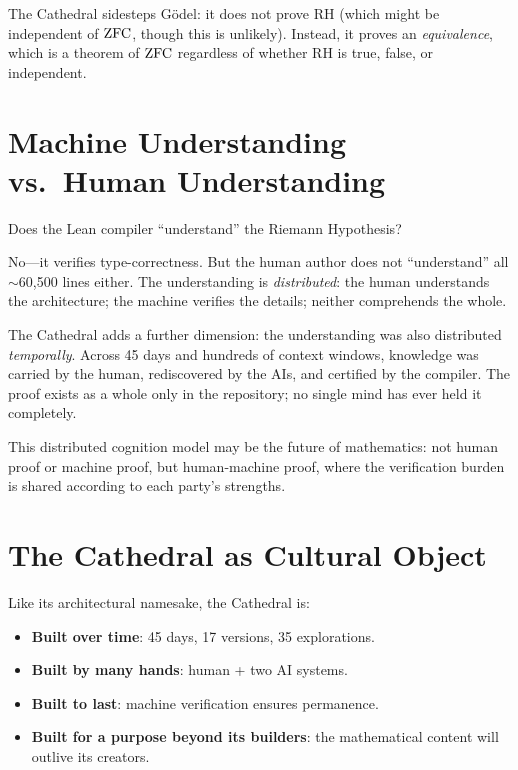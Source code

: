 \documentclass[11pt,a4paper]{article}
\begin{document}
The Cathedral sidesteps G\"odel: it does not prove RH (which might
be independent of $\mathrm{ZFC}$, though this is unlikely). Instead, it
proves an \emph{equivalence}, which is a theorem of $\mathrm{ZFC}$
regardless of whether RH is true, false, or independent.

\section{Machine Understanding vs.\ Human Understanding}

Does the Lean compiler ``understand'' the Riemann Hypothesis?

No---it verifies type-correctness. But the human author does not
``understand'' all $\sim$60{,}500 lines either. The understanding is
\emph{distributed}: the human understands the architecture; the
machine verifies the details; neither comprehends the whole.

The Cathedral adds a further dimension: the understanding was
also distributed \emph{temporally}. Across 45 days and hundreds
of context windows, knowledge was carried by the human, rediscovered
by the AIs, and certified by the compiler. The proof exists as a
whole only in the repository; no single mind has ever held it
completely.

This distributed cognition model may be the future of mathematics:
not human proof or machine proof, but human-machine proof, where
the verification burden is shared according to each party's
strengths.

\section{The Cathedral as Cultural Object}

Like its architectural namesake, the Cathedral is:
\begin{itemize}
  \item \textbf{Built over time}: 45 days, 17 versions, 35 explorations.
  \item \textbf{Built by many hands}: human + two AI systems.
  \item \textbf{Built to last}: machine verification ensures
    permanence.
  \item \textbf{Built for a purpose beyond its builders}:
    the mathematical content will outlive its creators.
\end{itemize}
\end{document}
